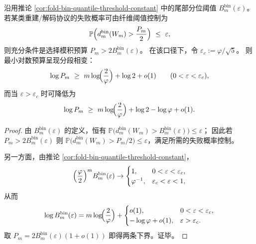 

\begin{corollary}[重建预算的相变：阈值 \texorpdfstring{$\varepsilon_c=\varphi/\sqrt5$}{epsc=phi/sqrt5} 处出现 \texorpdfstring{$\log\varphi$}{log phi} 级节省]\label{cor:fold-bin-budget-phase-transition}
沿用推论 \ref{cor:fold-bin-quantile-threshold-constant} 中的尾部分位阈值 \(B^{\mathrm{bin}}_m(\varepsilon)\)。
若某类重建/解码协议的失败概率可由纤维阈值控制为
\[
\mathbb{P}\Bigl(d^{\mathrm{bin}}_m(W_m)>\frac{P_m}{2}\Bigr)\ \le\ \varepsilon,
\]
则充分条件是选择模积预算 \(P_m>2B^{\mathrm{bin}}_m(\varepsilon)\)。
在该口径下，令 \(\varepsilon_c:=\varphi/\sqrt5\)。
则最小对数预算呈现分段相变：
\[
\log P_m\ \ge\ m\log\!\Bigl(\frac{2}{\varphi}\Bigr)+\log 2+o(1)\qquad(0<\varepsilon<\varepsilon_c),
\]
而当 \(\varepsilon>\varepsilon_c\) 时可降低为
\[
\log P_m\ \ge\ m\log\!\Bigl(\frac{2}{\varphi}\Bigr)+\log 2-\log\varphi+o(1).
\]
\end{corollary}

\begin{proof}
由 \(B^{\mathrm{bin}}_m(\varepsilon)\) 的定义，恒有
\(
\mathbb{P}\bigl(d^{\mathrm{bin}}_m(W_m)>B^{\mathrm{bin}}_m(\varepsilon)\bigr)\le \varepsilon
\)；
因此若 \(P_m>2B^{\mathrm{bin}}_m(\varepsilon)\) 则
\(
\mathbb{P}\bigl(d^{\mathrm{bin}}_m(W_m)>P_m/2\bigr)\le\varepsilon
\)，满足所需的失败概率控制。
\par
另一方面，由推论 \ref{cor:fold-bin-quantile-threshold-constant}，
\[
\Bigl(\frac{\varphi}{2}\Bigr)^m B^{\mathrm{bin}}_m(\varepsilon)\to
\begin{cases}
1,& 0<\varepsilon<\varepsilon_c,\\
\varphi^{-1},& \varepsilon_c<\varepsilon<1,
\end{cases}
\]
从而
\[
\log B^{\mathrm{bin}}_m(\varepsilon)
=m\log\!\Bigl(\frac{2}{\varphi}\Bigr)+
\begin{cases}
o(1),& 0<\varepsilon<\varepsilon_c,\\
-\log\varphi+o(1),& \varepsilon>\varepsilon_c.
\end{cases}
\]
取 \(P_m=2B^{\mathrm{bin}}_m(\varepsilon)(1+o(1))\) 即得两条下界。证毕。
\end{proof}

